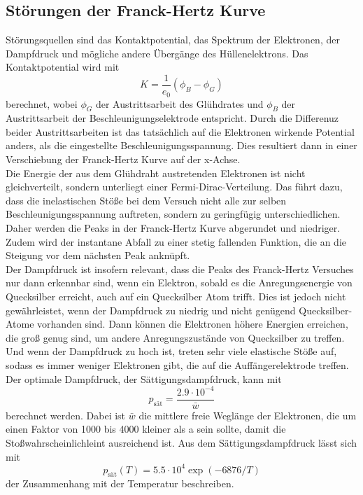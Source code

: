 \subsection{Störungen der Franck-Hertz Kurve}
Störungsquellen sind das Kontaktpotential, das Spektrum der Elektronen, der Dampfdruck und mögliche andere Übergänge des Hüllenelektrons.
Das Kontaktpotential wird mit
\begin{equation}
    K=\frac{1}{e_0}(\phi_B-\phi_G)
    \label{eqn:Kontaktpotential}
\end{equation}
berechnet, wobei $\phi_G$ der Austrittsarbeit des Glühdrates und $\phi_B$ der Austrittsarbeit der Beschleunigungselektrode entspricht.
Durch die Differenuz beider Austrittsarbeiten ist das tatsächlich auf die Elektronen wirkende Potential anders, als die eingestellte Beschleunigungsspannung.
Dies resultiert dann in einer Verschiebung der Franck-Hertz Kurve auf der x-Achse.\\
Die Energie der aus dem Glühdraht austretenden Elektronen ist nicht gleichverteilt, sondern unterliegt einer Fermi-Dirac-Verteilung.
Das führt dazu, dass die inelastischen Stöße bei dem Versuch nicht alle zur selben Beschleunigungsspannung auftreten, sondern zu geringfügig unterschiedlichen.
Daher werden die Peaks in der Franck-Hertz Kurve abgerundet und niedriger.
Zudem wird der instantane Abfall zu einer stetig fallenden Funktion, die an die Steigung vor dem nächsten Peak anknüpft.\\
Der Dampfdruck ist insofern relevant, dass die Peaks des Franck-Hertz Versuches nur dann erkennbar sind, wenn ein Elektron, sobald es die Anregungsenergie von Quecksilber erreicht, auch auf ein Quecksilber Atom trifft.
Dies ist jedoch nicht gewährleistet, wenn der Dampfdruck zu niedrig und nicht genügend Quecksilber-Atome vorhanden sind.
Dann können die Elektronen höhere Energien erreichen, die groß genug sind, um andere Anregungszustände von Quecksilber zu treffen.
Und wenn der Dampfdruck zu hoch ist, treten sehr viele elastische Stöße auf, sodass es immer weniger Elektronen gibt, die auf die Auffängerelektrode treffen.
Der optimale Dampfdruck, der Sättigungsdampfdruck, kann mit 
\begin{equation}
   p_{\textrm{sät}} =\frac{2.9\cdot10^{-4}}{\bar{w}}
    \label{eqn:Sättigungsdampfdruck}
\end{equation}
berechnet werden.
Dabei ist $\bar{w}$ die mittlere freie Weglänge der Elektronen, die um einen Faktor von 1000 bis 4000 kleiner als a sein sollte, damit die Stoßwahrscheinlichleint ausreichend ist.
Aus dem Sättigungsdampfdruck lässt sich mit 
\begin{equation}
    p_{\textrm{sät}}(T)=5.5 \cdot 10^4 \exp(-6876/T)
    \label{eqn:Temperatur}
\end{equation}
der Zusammenhang mit der Temperatur beschreiben.

\cite{V601}

